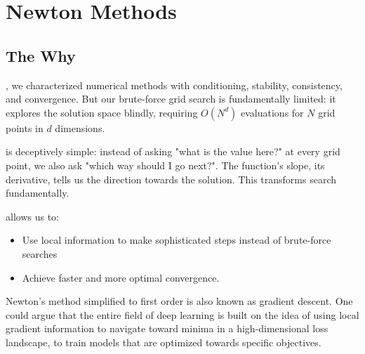 \chapter{Newton Methods}






\section{The Why}

, 
we characterized numerical methods with conditioning, stability, consistency, and convergence.
But our brute-force grid search is fundamentally limited: it explores the solution space blindly, 
requiring $O(N^d)$ evaluations for $N$ grid points in $d$ dimensions.

 is deceptively simple: instead of asking "what is the value here?" at every grid point, we also ask "which way should I go next?".
The function's slope, its derivative, tells us the direction towards the solution.
This transforms search fundamentally.

 allows us to:
\begin{itemize}
    \item Use local information to make sophisticated steps instead of brute-force searches
    \item Achieve faster and more optimal convergence.
\end{itemize}

 Newton's method simplified to first order is also known as 
gradient descent. One could argue that the entire field of deep learning is built on the idea of using 
local gradient information to navigate toward minima in a high-dimensional loss landscape, 
to train models that are optimized towards specific objectives.

